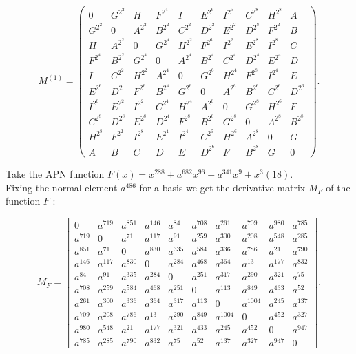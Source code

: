 \documentclass[10pt]{article}
\begin{document}
\[
M^{(1)}=\left(\begin{array}{cccccccccc}
0 & G^{2^{2}} & H & F^{2^{4}} & I & E^{2^{6}} & I^{2^{6}} & C^{2^{8}} & H^{2^{8}} & A  \tag{24}\\
G^{2^{2}} & 0 & A^{2^{2}} & B^{2^{2}} & C^{2^{2}} & D^{2^{2}} & E^{2^{2}} & D^{2^{8}} & F^{2^{2}} & B \\
H & A^{2^{2}} & 0 & G^{2^{4}} & H^{2^{2}} & F^{2^{6}} & I^{2^{2}} & E^{2^{8}} & I^{2^{8}} & C \\
F^{2^{4}} & B^{2^{2}} & G^{2^{4}} & 0 & A^{2^{4}} & B^{2^{4}} & C^{2^{4}} & D^{2^{4}} & E^{2^{4}} & D \\
I & C^{2^{2}} & H^{2^{2}} & A^{2^{4}} & 0 & G^{2^{6}} & H^{2^{4}} & F^{2^{8}} & I^{2^{4}} & E \\
E^{2^{6}} & D^{2} & F^{2^{6}} & B^{2^{4}} & G^{2^{6}} & 0 & A^{2^{6}} & B^{2^{6}} & C^{2^{6}} & D^{2^{6}} \\
I^{2^{6}} & E^{2^{2}} & I^{2^{2}} & C^{2^{4}} & H^{2^{4}} & A^{2^{6}} & 0 & G^{2^{8}} & H^{2^{6}} & F \\
C^{2^{8}} & D^{2^{8}} & E^{2^{8}} & D^{2^{4}} & F^{2^{8}} & B^{2^{6}} & G^{2^{8}} & 0 & A^{2^{8}} & B^{2^{8}} \\
H^{2^{8}} & F^{2^{2}} & I^{2^{8}} & E^{2^{4}} & I^{2^{4}} & C^{2^{6}} & H^{2^{6}} & A^{2^{8}} & 0 & G \\
A & B & C & D & E & D^{2^{6}} & F & B^{2^{8}} & G & 0
\end{array}\right) .
\]

Take the APN function $F(x)=x^{288}+a^{682} x^{96}+a^{341} x^{9}+x^{3}(18)$.\\
Fixing the normal element $a^{486}$ for a basis we get the derivative matrix $M_{F}$ of the function $F$ :

\[
M_{F}=\left[\begin{array}{cccccccccc}
0 & a^{719} & a^{851} & a^{146} & a^{84} & a^{708} & a^{261} & a^{709} & a^{980} & a^{785}  \tag{25}\\
a^{719} & 0 & a^{71} & a^{117} & a^{91} & a^{259} & a^{300} & a^{208} & a^{548} & a^{285} \\
a^{851} & a^{71} & 0 & a^{830} & a^{335} & a^{584} & a^{336} & a^{786} & a^{21} & a^{790} \\
a^{146} & a^{117} & a^{830} & 0 & a^{284} & a^{468} & a^{364} & a^{13} & a^{177} & a^{832} \\
a^{84} & a^{91} & a^{335} & a^{284} & 0 & a^{251} & a^{317} & a^{290} & a^{321} & a^{75} \\
a^{708} & a^{259} & a^{584} & a^{468} & a^{251} & 0 & a^{113} & a^{849} & a^{433} & a^{52} \\
a^{261} & a^{300} & a^{336} & a^{364} & a^{317} & a^{113} & 0 & a^{1004} & a^{245} & a^{137} \\
a^{709} & a^{208} & a^{786} & a^{13} & a^{290} & a^{849} & a^{1004} & 0 & a^{452} & a^{327} \\
a^{980} & a^{548} & a^{21} & a^{177} & a^{321} & a^{433} & a^{245} & a^{452} & 0 & a^{947} \\
a^{785} & a^{285} & a^{790} & a^{832} & a^{75} & a^{52} & a^{137} & a^{327} & a^{947} & 0
\end{array}\right] .
\]
\end{document}
